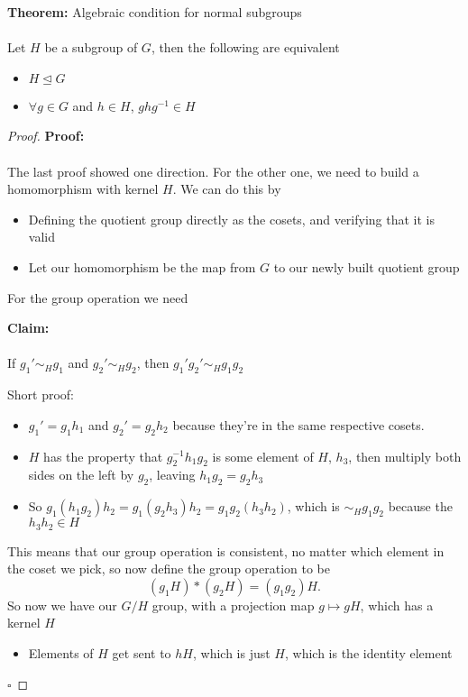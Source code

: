 \documentclass{article}
\newcommand{\qed}{\null\nobreak\hfill\ensuremath{\square}}
\begin{document}
\begin{theorem} 
\textbf{Theorem:} {\color{blue} Algebraic condition for normal subgroups} \\
~\\
Let $H$ be a subgroup of $G$, then the following are equivalent 
\begin{itemize}
	\item $H \trianglelefteq G$
	\item $\forall g\in G$ and $h\in H$, $ghg^{-1} \in H$
\end{itemize}
\begin{proof} 
\textbf{Proof:} \\
~\\
The last proof showed one direction. For the other one, we need to build a homomorphism with kernel $H$. We can do this by
\begin{itemize}
	\item Defining the quotient group directly as the cosets, and verifying that it is valid
	\item Let our homomorphism be the map from $G$ to our newly built quotient group
\end{itemize}
For the group operation we need
\begin{claim} 
\textbf{Claim:} \\
~\\
If $g_1' \sim _H g_1$ and $g_2' \sim _H g_2$, then $g_1'g_2' \sim _H g_1g_2$
\end{claim}
Short proof:
\begin{itemize}
	\item $g_1' = g_1h_1$ and $g_2'=g_2h_2$ because they're in the same respective cosets. 
	\item $H$ has the property that $g_2^{-1}h_1g_2$ is some element of $H$, $h_3$, then multiply both sides on the left by $g_2$, leaving $h_1g_2 = g_2h_3$
	\item So $g_1(h_1g_2)h_2 = g_1(g_2h_3)h_2 = g_1g_2(h_3h_2)$, which is $\sim _H g_1g_2$ because the $h_3h_2 \in H$  
\end{itemize}
This means that our group operation is consistent, no matter which element in the coset we pick, so now define the group operation to be
\[
	(g_1H)*(g_2H) = (g_1g_2)H
.\] 
So now we have our $G /H$ group, with a projection map $g \mapsto gH$, which has a kernel $H$
\begin{itemize}
	\item Elements of $H$ get sent to $hH$, which is just $H$, which is the identity element
\end{itemize}
\qed
\end{proof}
\end{theorem}
\end{document}
